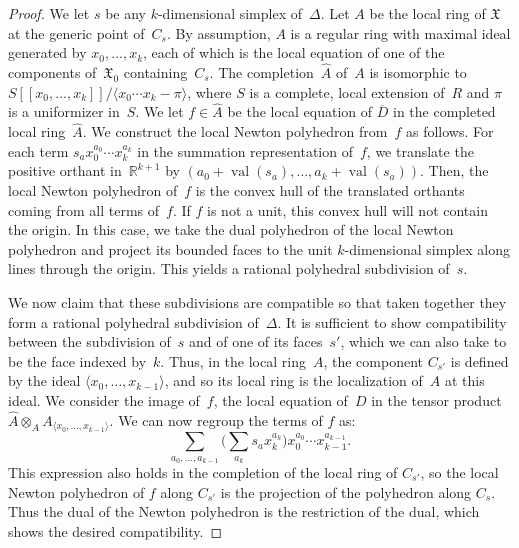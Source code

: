 \documentclass[11pt]{amsart}
\theoremstyle{definition}
\newcommand{\RR}{\mathbb R}
\newcommand{\val}{\operatorname{val}}
\newcommand{\X}{\mathfrak X}
\begin{document}
\begin{proof}
We let $s$ be any $k$-dimensional simplex of~$\Delta$. Let $A$ be the local
ring of $\X$ at the generic point of~$C_s$. By assumption, $A$ is a regular
ring with maximal ideal generated by $x_0, \ldots, x_k$, each of which is the
local
equation of one of the components of~$\X_0$ containing~$C_s$. The
completion~$\widehat A$ of~$A$ is isomorphic to $S[[x_0, \ldots, x_k]]/\langle
x_0 \cdots x_k - \pi\rangle$, where $S$ is a complete, local extension of~$R$
and $\pi$ is a uniformizer in~$S$. We let $f \in \widehat A$ be the local
equation of $\overline D$ in the completed local ring~$\widehat A$. We construct
the local Newton polyhedron from~$f$ as follows. For each term $s_a x_0^{a_0}
\cdots x_k^{a_k}$ in the summation representation of~$f$, we translate the
positive orthant in~$\RR^{k+1}$ by $(a_0 + \val(s_a), \ldots, a_k + \val(s_a))$.
Then, the local Newton polyhedron of~$f$ is the convex hull of the translated
orthants coming from all terms of~$f$. If $f$ is not a unit, this convex hull
will not contain the origin. In this case, we take the dual polyhedron of the
local Newton polyhedron and project its bounded faces to the 
unit $k$-dimensional simplex along lines
through the origin. This yields a rational polyhedral subdivision of~$s$.

We now claim that these subdivisions are compatible so that taken together they
form a rational polyhedral subdivision of~$\Delta$. It is sufficient to show
compatibility between the subdivision of~$s$ and of one of its faces~$s'$, which
we can also take to be the face indexed by~$k$.
Thus, in the local ring~$A$, the component $C_{s'}$ is
defined by the ideal $\langle x_0, \ldots, x_{k-1}\rangle$, and so its local
ring is the
localization of~$A$ at this ideal. We consider the image of~$f$, the local
equation of~$D$ in the tensor product $\widehat A \otimes_A A_{\langle x_0,
\ldots, x_{k-1}\rangle}$. We can now regroup the terms of $f$ as:
\begin{equation*}
\sum_{a_0, \ldots, a_{k-1}} \bigg(\sum_{a_k} s_ax_k^{a_k}\bigg) x_0^{a_0} \cdots
x_{k-1}^{a_{k-1}}.
\end{equation*}
This expression also holds in the completion of the local ring of $C_{s'}$,
so the local Newton polyhedron of $f$ along $C_{s'}$ is
the projection of the polyhedron along $C_s$. Thus the dual of the Newton
polyhedron is the restriction of the dual, which shows the desired
compatibility.


\end{proof}
\end{document}
